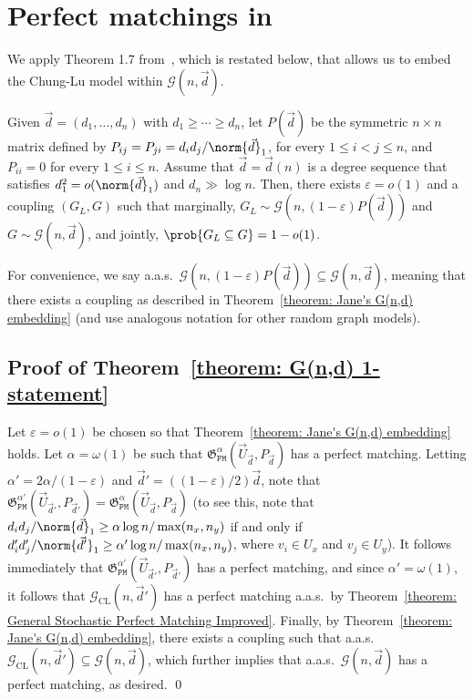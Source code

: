 \documentclass[12pt]{article}
\begin{document}
\section{Perfect matchings in }
\label{section: Proofs for G(n,d)}


We apply Theorem 1.7 from~\cite{Gao_2024}, which is restated below, that allows us to embed the Chung-Lu model within $\mathcal{G}(n,\vec{d})$.

\begin{theorem}
\label{theorem: Jane's G(n,d) embedding}
Given $\vec{d} = (d_1,\ldots,d_n)$ with $d_1\geq\cdots\geq d_n$, let $P(\vec{d})$ be the symmetric $n\times n$ matrix defined by $P_{ij} = P_{ji} = d_i d_j/\norm{\vec{d}}_1$, for every $1\leq i < j\leq n$, and $P_{ii} = 0$ for every $1\leq i\leq n$. Assume that $\vec{d} = \vec{d}(n)$ is a degree sequence that satisfies $d_1^2 = o(\norm{\vec{d}}_1)$ and $d_n\gg\log n$. Then, there exists $\varepsilon = o(1)$ and a coupling $(G_L, G)$ such that marginally, $G_L\sim\mathcal{G}(n, (1-\varepsilon)P(\vec{d}))$ and $G\sim\mathcal{G}(n,\vec{d})$, and jointly, $\prob{G_L\subseteq G} = 1-o(1)$. 
\end{theorem}

For convenience, we say a.a.s.\ $\mathcal{G}(n, (1-\varepsilon) P(\vec{d}))\subseteq\mathcal{G}(n,\vec{d})$, meaning that there exists a coupling as described in Theorem~\ref{theorem: Jane's G(n,d) embedding} (and use analogous notation for other random graph models).

\subsection{Proof of Theorem~\ref{theorem: G(n,d) 1-statement}}
\label{section: proof of G(n,d) 1-statement}

Let $\varepsilon=o(1)$ be chosen so that Theorem~\ref{theorem: Jane's G(n,d) embedding} holds.
Let $\alpha = \omega(1)$ be such that $\mathfrak{G}_{\texttt{PM}}^{\alpha}(\vec{U}_{\vec{d}}, P_{\vec{d}})$ has a perfect matching. Letting $\alpha' = 2\alpha/(1-\varepsilon)$ and $\vec{d}' = ((1-\varepsilon)/2)  \vec{d}$, note that $\mathfrak{G}_{\texttt{PM}}^{\alpha'}(\vec{U}_{\vec{d}'}, P_{\vec{d}'})=\mathfrak{G}_{\texttt{PM}}^{\alpha}(\vec{U}_{\vec{d}}, P_{\vec{d}})$ (to see this, note that $d_i d_j/\norm{\vec{d}}_1\geq\alpha\log n/\max(n_x, n_y)$ if and only if $d'_i d'_j/\norm{\vec{d}'}_1\geq\alpha'\log n/\max(n_x, n_y)$, where $v_i\in U_x$ and $v_j\in U_y$). It follows immediately that $\mathfrak{G}_{\texttt{PM}}^{\alpha'}(\vec{U}_{\vec{d}'}, P_{\vec{d}'})$ has a perfect matching, and since $\alpha' = \omega(1)$, it follows that $\mathcal{G}_{\text{CL}}(n,\vec{d}')$ has a perfect matching a.a.s.\ by Theorem~\ref{theorem: General Stochastic Perfect Matching Improved}. Finally, by Theorem~\ref{theorem: Jane's G(n,d) embedding}, there exists a coupling such that a.a.s.\ $\mathcal{G}_{\text{CL}}(n,\vec{d}')\subseteq\mathcal{G}(n,\vec{d})$, which further implies that a.a.s.\ $\mathcal{G}(n,\vec{d})$ has a perfect matching, as desired. \qed
\end{document}
